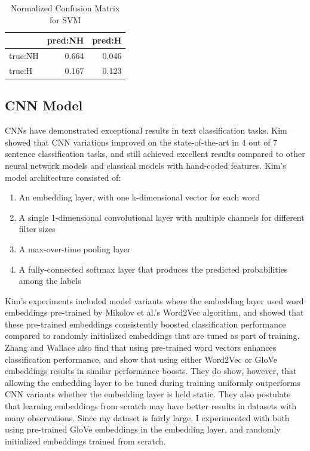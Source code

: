 \documentclass[11pt,a4paper]{article}
\begin{document}
	\begin{table}
		\begin{center}
			\begin{tabular}{lrr}
				\hline
				{} &  pred:NH &  pred:H \\
				\hline
				true:NH     &         0.664 &             0.046 \\
				true:H      &         0.167 &             0.123 \\
				\hline
			\end{tabular}
			\caption{Normalized Confusion Matrix for SVM}
		\end{center}
	\end{table}
	
	\subsection{CNN Model}
	CNNs have demonstrated exceptional results in text classification tasks. Kim \cite{Kim} showed that CNN variations improved on the state-of-the-art in 4 out of 7 sentence classification tasks, and still achieved excellent results compared to other neural network models and classical models with hand-coded features. Kim's model architecture consisted of:
	
	\begin{enumerate}
		\item An embedding layer, with one k-dimensional vector for each word
		\item A single 1-dimensional convolutional layer with multiple channels for different filter sizes
		\item A max-over-time pooling layer
		\item A fully-connected softmax layer that produces the predicted probabilities among the labels
	\end{enumerate}
	
	Kim's experiments included model variants where the embedding layer used word embeddings pre-trained by Mikolov et al.'s \cite{word2vec} Word2Vec algorithm, and showed that these pre-trained embeddings  consistently boosted classification performance compared to randomly initialized embeddings that are tuned as part of training. Zhang and Wallace \cite{Zhang} also find that using pre-trained word vectors enhances classification performance, and show that using either Word2Vec or GloVe \cite{Pennington} embeddings results in similar performance boosts. They do show, however, that allowing the embedding layer to be tuned during training uniformly outperforms CNN variants whether the embedding layer is held static. They also postulate that learning embeddings from scratch may have better results in datasets with many observations. Since my dataset is fairly large, I experimented with both using pre-trained GloVe embeddings in the embedding layer, and randomly initialized embeddings trained from scratch.
	
\end{document}
